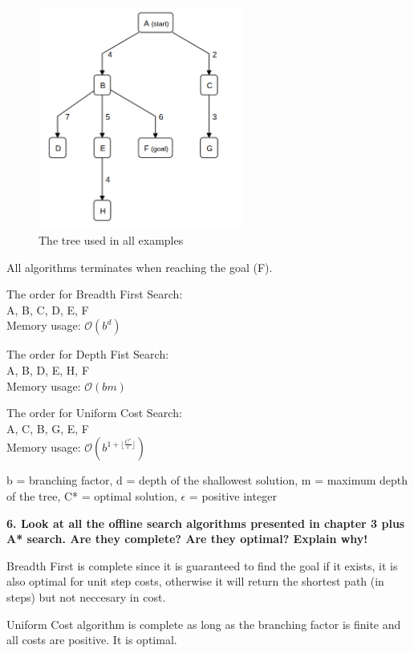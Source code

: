 \documentclass[12pt,a4paper]{article}
\begin{document}
\begin{figure}[ht]
	\centering
	\includegraphics[width=0.6\textwidth]{graph}
	\caption{The tree used in all examples}
\end{figure}

All algorithms terminates when reaching the goal (F).

The order for Breadth First Search: \\
A, B, C, D, E, F \\
Memory usage: $\mathcal{O}(b^d)$

The order for Depth Fist Search: \\
A, B, D, E, H, F \\
Memory usage: $\mathcal{O}(bm)$

The order for Uniform Cost Search: \\
A, C, B, G, E, F \\
Memory usage: $\mathcal{O}(b^{1+\lfloor\frac{C^*}{\epsilon}\rfloor})$

b = branching factor, d = depth of the shallowest solution, m = maximum depth of the tree, C* = optimal solution, $\epsilon$ = positive integer

\textbf{6. Look at all the offline search algorithms presented in chapter 3 plus A* search. Are they complete? Are they optimal? Explain why!}

Breadth First is complete since it is guaranteed to find the goal if it exists, it is also optimal for unit step costs, otherwise it will return the shortest path (in steps) but not neccesary in cost.

Uniform Cost algorithm is complete as long as the branching factor is finite and all costs are positive. It is optimal.
\end{document}

